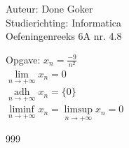 \documentclass[a4paper]{article}
\begin{document}
  
\noindent \large Auteur: Done Goker \\
\noindent \large Studierichting: Informatica\\
\noindent \large Oefeningenreeks 6A nr. 4.8\\

\medskip

\normalsize

Opgave: $x_n = \frac{-9}{n^2}$ \\

$\lim\limits_{n \rightarrow +\infty} x_n = 0$ \\

$\operatorname*{adh}\limits_{n \rightarrow +\infty} x_n = \{ 0 \}$ \\

$\liminf\limits_{n \rightarrow +\infty} x_n = \limsup\limits_{n \rightarrow +\infty} x_n = 0$ \\


\begin{thebibliography}{999}
\end{thebibliography}
\end{document}
